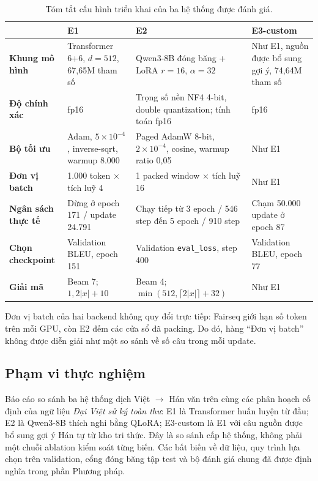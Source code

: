\begin{table}[tbp]
  \centering
  \footnotesize
  \renewcommand{\arraystretch}{1.16}
  \setlength{\tabcolsep}{3.5pt}
  \caption{Tóm tắt cấu hình triển khai của ba hệ thống được đánh giá.}
  \label{tab:exp-recap}
  \begin{tabularx}{\textwidth}{@{}>{\bfseries}p{2.35cm}XXX@{}}
    \toprule
    & E1 & E2 & E3-custom \\
    \midrule
    Khung mô hình
      & Transformer 6+6, $d=512$, 67,65M tham số
      & Qwen3-8B đóng băng + LoRA $r=16$, $\alpha=32$
      & Như E1, nguồn được bổ sung gợi ý, 74,64M tham số \\
    Độ chính xác
      & fp16
      & Trọng số nền NF4 4-bit, double quantization; tính toán fp16
      & fp16 \\
    Bộ tối ưu
      & Adam, $5\times10^{-4}$, inverse-sqrt, warmup 8.000
      & Paged AdamW 8-bit, $2\times10^{-4}$, cosine, warmup ratio 0,05
      & Như E1 \\
    Đơn vị batch
      & 1.000 token $\times$ tích luỹ 4
      & 1 packed window $\times$ tích luỹ 16
      & Như E1 \\
    Ngân sách thực tế
      & Dừng ở epoch 171 / update 24.791
      & Chạy tiếp từ 3 epoch / 546 step đến 5 epoch / 910 step
      & Chạm 50.000 update ở epoch 87 \\
    Chọn checkpoint
      & Validation BLEU, epoch 151
      & Validation \texttt{eval\_loss}, step 400
      & Validation BLEU, epoch 77 \\
    Giải mã
      & Beam 7; $1{,}2|x|+10$
      & Beam 4; $\min(512,\lceil2|x|\rceil+32)$
      & Như E1 \\
    \bottomrule
  \end{tabularx}
\end{table}

Đơn vị batch của hai backend không quy đổi trực tiếp: Fairseq giới hạn số token
trên mỗi GPU, còn E2 đếm các cửa sổ đã packing. Do đó, hàng “Đơn vị batch”
không được diễn giải như một so sánh về số câu trong mỗi update.

\subsection{Phạm vi thực nghiệm}

Báo cáo so sánh ba hệ thống dịch Việt $\rightarrow$ Hán văn trên cùng các phân
hoạch cố định của ngữ liệu \emph{Đại Việt sử ký toàn thư}: E1 là Transformer
huấn luyện từ đầu; E2 là Qwen3-8B thích nghi bằng QLoRA; E3-custom là E1 với
câu nguồn được bổ sung gợi ý Hán tự từ kho tri thức. Đây là so sánh cấp hệ
thống, không phải một chuỗi ablation kiểm soát từng biến. Các bất biến về dữ
liệu, quy trình lựa chọn trên validation, cổng đóng băng tập test và bộ đánh
giá chung đã được định nghĩa trong phần Phương pháp.

